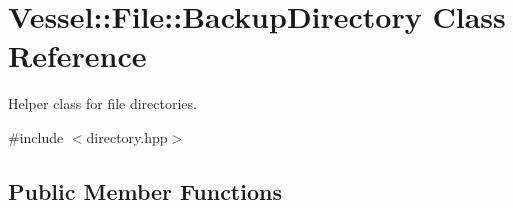 \hypertarget{class_vessel_1_1_file_1_1_backup_directory}{}\section{Vessel\+:\+:File\+:\+:Backup\+Directory Class Reference}
\label{class_vessel_1_1_file_1_1_backup_directory}


Helper class for file directories.  




{\ttfamily \#include $<$directory.\+hpp$>$}

\subsection*{Public Member Functions}

